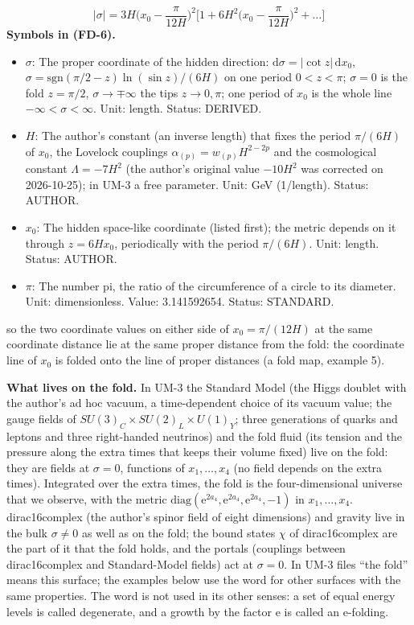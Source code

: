 \documentclass[
  10pt,
]{article}
\providecommand{\tightlist}{%
  \setlength{\itemsep}{0pt}\setlength{\parskip}{0pt}}
\begin{document}
\[
\lvert\sigma\rvert = 3H\Big(x_0 - \frac{\pi}{12H}\Big)^2\Big[1 + 6H^2\Big(x_0 - \frac{\pi}{12H}\Big)^2 + \dots\Big] \tag{FD-6}
\] \textbf{Symbols in (FD-6).}

\begin{itemize}
\tightlist
\item
  \(\sigma\): The proper coordinate of the hidden direction:
  \(\mathrm{d}\sigma = \lvert\cot z\rvert\,\mathrm{d}x_0\),
  \(\sigma = \mathrm{sgn}(\pi/2 - z)\ln(\sin z)/(6H)\) on one period
  \(0 < z < \pi\); \(\sigma = 0\) is the fold \(z = \pi/2\),
  \(\sigma \to \mp\infty\) the tips \(z \to 0, \pi\); one period of
  \(x_0\) is the whole line \(-\infty < \sigma < \infty\). Unit: length.
  Status: DERIVED.
\item
  \(H\): The author's constant (an inverse length) that fixes the period
  \(\pi/(6H)\) of \(x_0\), the Lovelock couplings
  \(\alpha_{(p)} = w_{(p)}H^{2-2p}\) and the cosmological constant
  \(\Lambda = -7H^2\) (the author's original value \(-10H^2\) was
  corrected on 2026-10-25); in UM-3 a free parameter. Unit: GeV
  (1/length). Status: AUTHOR.
\item
  \(x_0\): The hidden space-like coordinate (listed first); the metric
  depends on it through \(z = 6Hx_0\), periodically with the period
  \(\pi/(6H)\). Unit: length. Status: AUTHOR.
\item
  \(\pi\): The number pi, the ratio of the circumference of a circle to
  its diameter. Unit: dimensionless. Value: 3.141592654. Status:
  STANDARD.
\end{itemize}

so the two coordinate values on either side of \(x_0 = \pi/(12H)\) at
the same coordinate distance lie at the same proper distance from the
fold: the coordinate line of \(x_0\) is folded onto the line of proper
distances (a fold map, example 5).

\textbf{What lives on the fold.} In UM-3 the Standard Model (the Higgs
doublet with the author's ad hoc vacuum, a time-dependent choice of its
vacuum value; the gauge fields of
\(SU(3)_C \times SU(2)_L \times U(1)_Y\); three generations of quarks
and leptons and three right-handed neutrinos) and the fold fluid (its
tension and the pressure along the extra times that keeps their volume
fixed) live on the fold: they are fields at \(\sigma = 0\), functions of
\(x_1, \dots, x_4\) (no field depends on the extra times). Integrated
over the extra times, the fold is the four-dimensional universe that we
observe, with the metric
\(\mathrm{diag}(\mathrm{e}^{2a_4}, \mathrm{e}^{2a_4}, \mathrm{e}^{2a_4}, -1)\)
in \(x_1, \dots, x_4\). dirac16complex (the author's spinor field of
eight dimensions) and gravity live in the bulk \(\sigma \ne 0\) as well
as on the fold; the bound states \(\chi\) of dirac16complex are the part
of it that the fold holds, and the portals (couplings between
dirac16complex and Standard-Model fields) act at \(\sigma = 0\). In UM-3
files ``the fold'' means this surface; the examples below use the word
for other surfaces with the same properties. The word is not used in its
other senses: a set of equal energy levels is called degenerate, and a
growth by the factor \(\mathrm{e}\) is called an e-folding.
\end{document}
